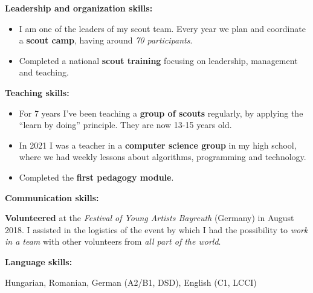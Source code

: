 \textbf{Leadership and organization skills:} 

\begin{itemize}
\item I am one of the leaders of my scout team. Every year we plan and coordinate a \textbf{scout camp}, having around \textit{70 participants}.

\item Completed a national \textbf{scout training} focusing on leadership, management and teaching.
\end{itemize}

\divider

\textbf{Teaching skills:} 

\begin{itemize}
 \item For 7 years I've been teaching a \textbf{group of scouts} regularly, by applying the ``learn by doing'' principle. They are now 13-15 years old.
 
 \item In 2021 I was a teacher in a \textbf{computer science group} in my high school, where we had weekly lessons about algorithms, programming and technology.
 
 \item Completed the \textbf{first pedagogy module}.
\end{itemize}



\divider

\textbf{Communication skills:} 

\textbf{Volunteered} at the \textit{Festival of Young Artists Bayreuth} (Germany) in August 2018. I assisted in the logistics of the event by which I had the possibility to \textit{work in a team} with other volunteers from \textit{all part of the world}.

\divider

\textbf{Language skills:} 

Hungarian, Romanian, German (A2/B1, DSD), English (C1, LCCI) 
